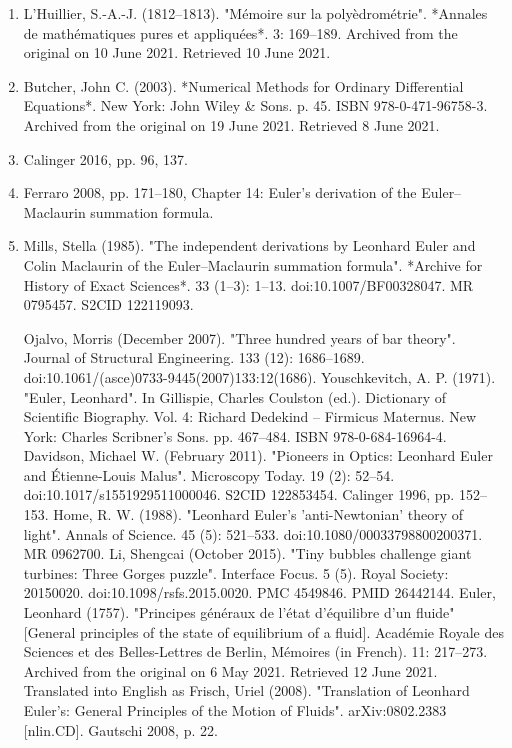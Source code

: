\begin{enumerate}
\item L'Huillier, S.-A.-J. (1812–1813). "Mémoire sur la polyèdrométrie". *Annales de mathématiques pures et appliquées*. 3: 169–189. Archived from the original on 10 June 2021. Retrieved 10 June 2021.
\item Butcher, John C. (2003). *Numerical Methods for Ordinary Differential Equations*. New York: John Wiley & Sons. p. 45. ISBN 978-0-471-96758-3. Archived from the original on 19 June 2021. Retrieved 8 June 2021.
\item Calinger 2016, pp. 96, 137.
\item Ferraro 2008, pp. 171–180, Chapter 14: Euler's derivation of the Euler–Maclaurin summation formula.
\item Mills, Stella (1985). "The independent derivations by Leonhard Euler and Colin Maclaurin of the Euler–Maclaurin summation formula". *Archive for History of Exact Sciences*. 33 (1–3): 1–13. doi:10.1007/BF00328047. MR 0795457. S2CID 122119093.



Ojalvo, Morris (December 2007). "Three hundred years of bar theory". Journal of Structural Engineering. 133 (12): 1686–1689. doi:10.1061/(asce)0733-9445(2007)133:12(1686).
Youschkevitch, A. P. (1971). "Euler, Leonhard". In Gillispie, Charles Coulston (ed.). Dictionary of Scientific Biography. Vol. 4: Richard Dedekind – Firmicus Maternus. New York: Charles Scribner's Sons. pp. 467–484. ISBN 978-0-684-16964-4.
Davidson, Michael W. (February 2011). "Pioneers in Optics: Leonhard Euler and Étienne-Louis Malus". Microscopy Today. 19 (2): 52–54. doi:10.1017/s1551929511000046. S2CID 122853454.
Calinger 1996, pp. 152–153.
Home, R. W. (1988). "Leonhard Euler's 'anti-Newtonian' theory of light". Annals of Science. 45 (5): 521–533. doi:10.1080/00033798800200371. MR 0962700.
Li, Shengcai (October 2015). "Tiny bubbles challenge giant turbines: Three Gorges puzzle". Interface Focus. 5 (5). Royal Society: 20150020. doi:10.1098/rsfs.2015.0020. PMC 4549846. PMID 26442144.
Euler, Leonhard (1757). "Principes généraux de l'état d'équilibre d'un fluide" [General principles of the state of equilibrium of a fluid]. Académie Royale des Sciences et des Belles-Lettres de Berlin, Mémoires (in French). 11: 217–273. Archived from the original on 6 May 2021. Retrieved 12 June 2021. Translated into English as Frisch, Uriel (2008). "Translation of Leonhard Euler's: General Principles of the Motion of Fluids". arXiv:0802.2383 [nlin.CD].
Gautschi 2008, p. 22.
\end{enumerate}